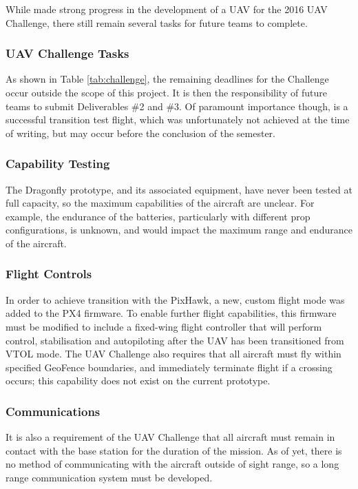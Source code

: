 \label{sec:futurework}
While \ID made strong progress in the development of a UAV for the 2016 UAV Challenge, there still remain several tasks for future teams to complete.

\subsubsection*{UAV Challenge Tasks}
As shown in Table \ref{tab:challenge}, the remaining deadlines for the Challenge occur outside the scope of this project. It is then the responsibility of future teams to submit Deliverables \#2 and \#3.  Of paramount importance though, is a successful transition test flight, which was unfortunately not achieved at the time of writing, but may occur before the conclusion of the semester.

\subsubsection*{Capability Testing}
The Dragonfly prototype, and its associated equipment, have never been tested at full capacity, so the maximum capabilities of the aircraft are unclear. For example, the endurance of the batteries, particularly with different prop configurations, is unknown, and would impact the maximum range and endurance of the aircraft.

\subsubsection*{Flight Controls}
In order to achieve transition with the PixHawk, a new, custom flight mode was added to the PX4 firmware. To enable further flight capabilities, this firmware must be modified to include a fixed-wing flight controller that will perform control, stabilisation and autopiloting after the UAV has been transitioned from VTOL mode. The UAV Challenge also requires that all aircraft must fly within specified GeoFence boundaries, and immediately terminate flight if a crossing occurs; this capability does not exist on the current prototype.

\subsubsection*{Communications}
It is also a requirement of the UAV Challenge that all aircraft must remain in contact with the base station for the duration of the mission. As of yet, there is no method of communicating with the aircraft outside of sight range, so a long range communication system must be developed. 

